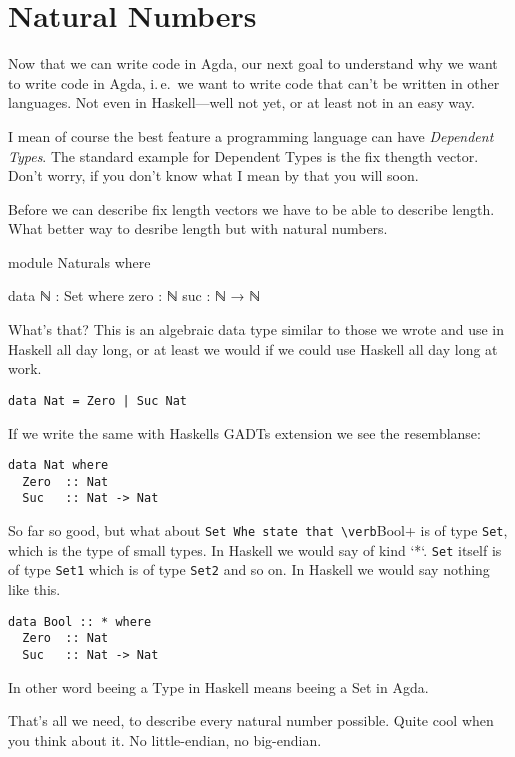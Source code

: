 \section{Natural Numbers}
Now that we can write code in Agda, our next goal to understand why we
want to write code in Agda, i. e. we want to write code that can’t be
written in other languages. Not even in Haskell—well not yet, or at
least not in an easy way.

I mean of course the best feature a programming language can have
\emph{Dependent Types}. The standard example for Dependent Types is the
fix thength vector. Don’t worry, if you don’t know what I mean by that
you will soon.

Before we can describe fix length vectors we have to be able to describe
length. What better way to desribe length but with natural numbers.

\begin{code}
module Naturals where

data ℕ : Set where
  zero : ℕ
  suc  : ℕ → ℕ
\end{code}

What's that? This is an algebraic data type similar to those we wrote and use
in Haskell all day long, or at least we would if we could use Haskell all day
long at work.

\begin{verbatim}
data Nat = Zero | Suc Nat
\end{verbatim}

If we write the same with Haskells GADTs extension we see the resemblanse:

\begin{verbatim}
data Nat where
  Zero  :: Nat
  Suc   :: Nat -> Nat
\end{verbatim}

So far so good, but what about \verb+Set Whe state that \verb+Bool+ is of type
\verb+Set+, which is the type of small types. In Haskell we would say of kind `*`.
\verb+Set+ itself is of type \verb+Set1+ which is of type \verb+Set2+ and so on. In Haskell
we would say nothing like this.

\begin{verbatim}
data Bool :: * where
  Zero  :: Nat
  Suc   :: Nat -> Nat
\end{verbatim}

In other word beeing a Type in Haskell means beeing a Set in Agda.

That's all we need, to describe every natural number possible.
Quite cool when you think about it. No little-endian, no big-endian.

